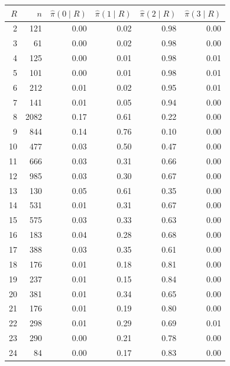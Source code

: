 \begin{tabular}{rrrrrr}
\toprule
$R$ & $n$ & $\hat\pi(0\mid R)$ & $\hat\pi(1\mid R)$ & $\hat\pi(2\mid R)$ & $\hat\pi(3\mid R)$ \\
\midrule
2 & 121 & 0.00 & 0.02 & 0.98 & 0.00 \\
3 & 61 & 0.00 & 0.02 & 0.98 & 0.00 \\
4 & 125 & 0.00 & 0.01 & 0.98 & 0.01 \\
5 & 101 & 0.00 & 0.01 & 0.98 & 0.01 \\
6 & 212 & 0.01 & 0.02 & 0.95 & 0.01 \\
7 & 141 & 0.01 & 0.05 & 0.94 & 0.00 \\
8 & 2082 & 0.17 & 0.61 & 0.22 & 0.00 \\
9 & 844 & 0.14 & 0.76 & 0.10 & 0.00 \\
10 & 477 & 0.03 & 0.50 & 0.47 & 0.00 \\
11 & 666 & 0.03 & 0.31 & 0.66 & 0.00 \\
12 & 985 & 0.03 & 0.30 & 0.67 & 0.00 \\
13 & 130 & 0.05 & 0.61 & 0.35 & 0.00 \\
14 & 531 & 0.01 & 0.31 & 0.67 & 0.00 \\
15 & 575 & 0.03 & 0.33 & 0.63 & 0.00 \\
16 & 183 & 0.04 & 0.28 & 0.68 & 0.00 \\
17 & 388 & 0.03 & 0.35 & 0.61 & 0.00 \\
18 & 176 & 0.01 & 0.18 & 0.81 & 0.00 \\
19 & 237 & 0.01 & 0.15 & 0.84 & 0.00 \\
20 & 381 & 0.01 & 0.34 & 0.65 & 0.00 \\
21 & 176 & 0.01 & 0.19 & 0.80 & 0.00 \\
22 & 298 & 0.01 & 0.29 & 0.69 & 0.01 \\
23 & 290 & 0.00 & 0.21 & 0.78 & 0.00 \\
24 & 84 & 0.00 & 0.17 & 0.83 & 0.00 \\
\bottomrule
\end{tabular}
